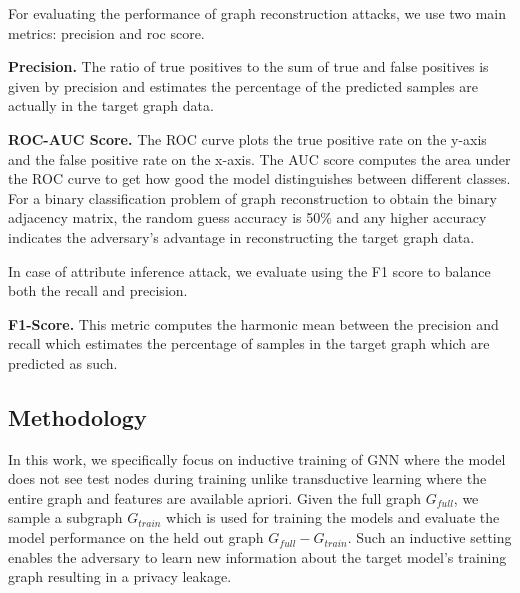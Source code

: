 \noindent For evaluating the performance of graph reconstruction attacks, we use two main metrics: precision and roc score.

\noindent\textbf{Precision.} The ratio of true positives to the sum of true and false positives is given by precision and estimates the percentage of the predicted samples are actually in the target graph data.

\noindent\textbf{ROC-AUC Score.} The ROC curve plots the true positive rate on the y-axis and the false positive rate on the x-axis. The AUC score computes the area under the ROC curve to get how good the model distinguishes between different classes.
For a binary classification problem of graph reconstruction to obtain the binary adjacency matrix, the random guess accuracy is 50\% and any higher accuracy indicates the adversary's advantage in reconstructing the target graph data.


\noindent In case of attribute inference attack, we evaluate using the F1 score to balance both the recall and precision.

\noindent\textbf{F1-Score.} This metric computes the harmonic mean between the precision and recall which estimates the percentage of samples in the target graph which are predicted as such.

\subsection{Methodology}

In this work, we specifically focus on inductive training of GNN where the model does not see test nodes during training unlike transductive learning where the entire graph and features are available apriori.
Given the full graph $G_{full}$, we sample a subgraph $G_{train}$ which is used for training the models and evaluate the model performance on the held out graph $G_{full}-G_{train}$.
Such an inductive setting enables the adversary to learn new information about the target model's training graph resulting in a privacy leakage.
